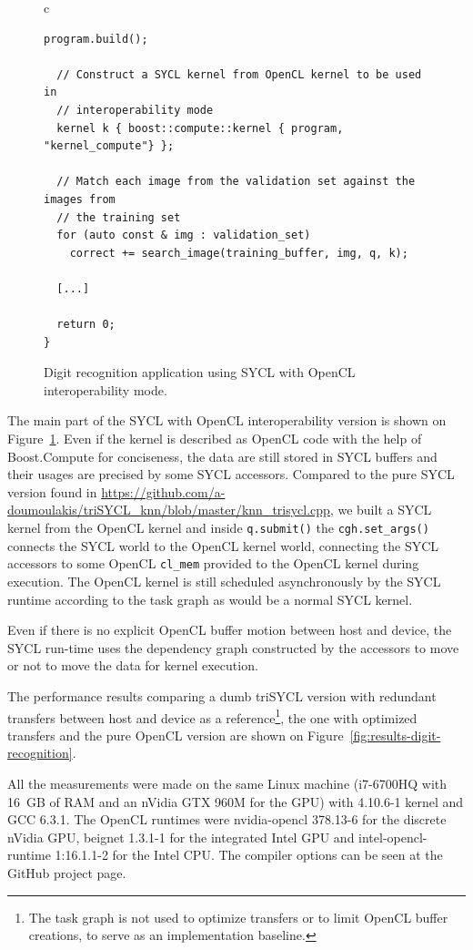 \documentclass[sigplan]{acmart}
\begin{document}
\begin{figure}
\begin{tabular}{c}
\begin{lstlisting}[basicstyle=\scriptsize]
  program.build();

  // Construct a SYCL kernel from OpenCL kernel to be used in
  // interoperability mode
  kernel k { boost::compute::kernel { program, "kernel_compute"} };

  // Match each image from the validation set against the images from
  // the training set
  for (auto const & img : validation_set)
    correct += search_image(training_buffer, img, q, k);

  [...]

  return 0;
}
    \end{lstlisting}
  \end{tabular}
  \caption{Digit recognition application using SYCL with OpenCL
    interoperability mode.\label{fig:digit-SYCL-OpenCL-code}}
\end{figure}


The main part of the SYCL with OpenCL interoperability version is
shown on Figure~\ref{fig:digit-SYCL-OpenCL-code}. Even if the kernel is
described as OpenCL code with the help of Boost.Compute
\cite{Boost.Compute} for conciseness, the data are still stored in
SYCL buffers and their usages are precised by some SYCL
accessors. Compared to the pure SYCL version found in
\url{https://github.com/a-doumoulakis/triSYCL_knn/blob/master/knn_trisycl.cpp},
we built a SYCL kernel from the OpenCL kernel and inside
\lstinline|q.submit()| the \lstinline|cgh.set_args()| connects the
SYCL world to the OpenCL kernel world, connecting the SYCL accessors
to some OpenCL \lstinline|cl_mem| provided to the OpenCL kernel during
execution. The OpenCL kernel is still scheduled asynchronously by the
SYCL runtime according to the task graph as would be a normal SYCL
kernel.

Even if there is no explicit OpenCL buffer motion between host and
device, the SYCL run-time uses the dependency graph constructed by the
accessors to move or not to move the data for kernel execution.

The performance results comparing a dumb triSYCL version with
redundant transfers between host and device as a
reference\footnote{The task graph is not used to optimize transfers or
  to limit OpenCL buffer creations, to serve as an implementation
  baseline.}, the one with optimized transfers and the pure OpenCL
version are shown on Figure~\ref{fig:results-digit-recognition}.

All the measurements were made on the same Linux machine (i7-6700HQ
with 16~GB of RAM and an nVidia GTX 960M for the GPU) with 4.10.6-1 kernel
and GCC 6.3.1. The OpenCL runtimes were nvidia-opencl
378.13-6 for the discrete nVidia GPU, beignet 1.3.1-1 for the
integrated Intel GPU and intel-opencl-runtime 1:16.1.1-2 for the Intel
CPU. The compiler options can be seen at the GitHub project page.
\end{document}
